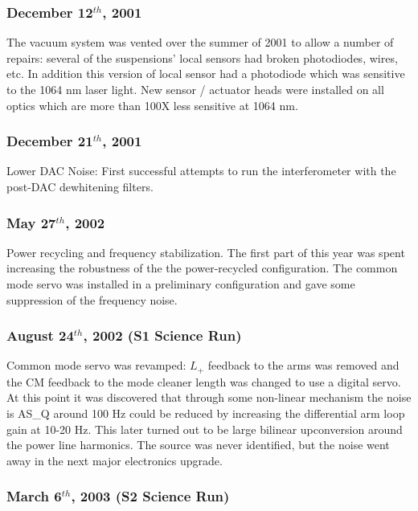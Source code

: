 \subsubsection{December 12$^{th}$, 2001}

The vacuum system was vented over the summer of 2001 to allow a number of repairs:
several of the suspensions' local sensors had broken photodiodes, wires, etc. 
In addition this version of local sensor had a photodiode which was sensitive to 
the 1064 nm laser light. New sensor / actuator heads were installed on all optics 
which are more than 100X less sensitive at 1064 nm.


\subsubsection{December 21$^{th}$, 2001}

Lower DAC Noise: First successful attempts to run the interferometer with the 
post-DAC dewhitening filters.


\subsubsection{May 27$^{th}$, 2002}

Power recycling and frequency stabilization. The first part of this year
was spent increasing the robustness of the the power-recycled configuration. 
The common mode servo was installed in a preliminary configuration and gave some
suppression of the frequency noise.


\subsubsection{August 24$^{th}$, 2002  (S1 Science Run)}

Common mode servo was revamped: $L_+$ feedback to the arms was removed
and the CM feedback to the mode cleaner length was changed to use a digital
servo. At this point it was discovered that through some non-linear
mechanism the noise is AS\_Q around 100 Hz could be reduced by increasing
the differential arm loop gain at 10-20 Hz. This later turned out to be
large bilinear upconversion around the power line harmonics. The source
was never identified, but the noise went away in the next major 
electronics upgrade.


\subsubsection{March 6$^{th}$, 2003  (S2 Science Run)}

